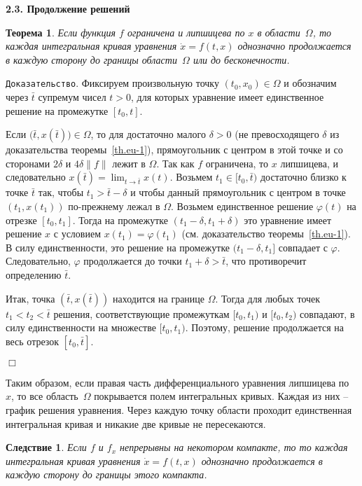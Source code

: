 \documentclass[12pt,a4paper]{article}
\newtheorem{theorem}{Теорема}
\newtheorem{cor}{Следствие}
\begin{document}
\medskip
\begin{center}
\textbf{2.3. Продолжение решений}
\end{center}
\medskip

\begin{theorem}\label{th.contin}
Если функция $f$ ограничена и липшицева по $x$ в области~$\Omega$,
то каждая интегральная кривая уравнения $\dot x = f(t, x)$
однозначно продолжается в каждую сторону до границы области~$\Omega$ или до бесконечности.
\end{theorem}
{\tt Доказательство}. Фиксируем произвольную точку $(t_0, x_0) \in \Omega$ и обозначим
через $\bar t$ супремум чисел $t > 0$, для которых уравнение имеет единственное решение на промежутке $[t_0, t]$.

Если $\bigl(\bar t, x(\bar t)\bigr) \in \Omega$, то для достаточно малого $\delta > 0$ (не превосходящего $\delta$ из доказательства теоремы~\ref{th.eu-1}), прямоугольник с центром в этой точке и со сторонами $2\delta$ и $4\delta \|f\|$ лежит в $\Omega$. Так как $f$ ограничена, то $x$ липшицева, и следовательно $x(\bar t) = \lim_{t \to \bar t} x(t)$. Возьмем $t_1 \in [t_0, \bar t)$ достаточно близко к точке $\bar t$ так, чтобы $t_1 > \bar t - \delta$ и чтобы данный прямоугольник с центром в точке $(t_1, x(t_1))$ по-прежнему лежал в $\Omega$.
Возьмем единственное решение $\varphi(t)$ на отрезке $[t_0, t_1]$. Тогда на промежутке $(t_1-\delta, t_1+\delta)$
это уравнение имеет решение $x$ с условием $x(t_1) = \varphi(t_1)$ (см. доказательство теоремы~\ref{th.eu-1}).
В силу единственности, это решение на промежутке $(t_1 - \delta, t_1]$ совпадает с $\varphi$.
Следовательно, $\varphi$ продолжается до точки $t_1 + \delta > \bar t$, что противоречит определению  $\bar t$.

Итак, точка $(\bar t , x(\bar t))$ находится на границе $\Omega$. Тогда для любых точек $t_1 < t_2 < \bar t$
решения, соответствующие промежуткам $[t_0, t_1)$ и $[t_0, t_2)$ совпадают, в силу единственности на множестве $[t_0, t_1)$.
Поэтому, решение продолжается на весь отрезок $[t_0, \bar t]$.


   {\hfill $\Box$}
\medskip


Таким образом, если правая часть дифференциального уравнения липшицева по~$x$, то все область~$\Omega$ покрывается
полем интегральных кривых. Каждая из них -- график решения уравнения. Через каждую точку области проходит единственная интегральная кривая и никакие две кривые не пересекаются.
\begin{cor}\label{c.lip3}
Если $f$ и $f_x$ непрерывны на некотором компакте, то
то каждая интегральная кривая уравнения $\dot x = f(t, x)$
однозначно продолжается в каждую сторону до границы этого компакта.
\end{cor}
\end{document}
